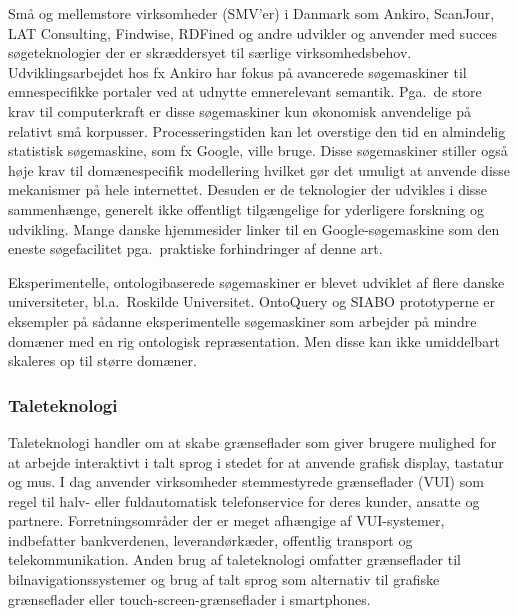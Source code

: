 \begin{multicols}{2}
\mbox{Sm\aa} og mellemstore virksomheder (SMV'er) i Danmark som Ankiro, ScanJour, LAT Consulting, Findwise, RDFined og andre udvikler og anvender med succes s\o geteknologier der er skr\ae ddersyet til s\ae rlige virksomhedsbehov. Udviklingsarbejdet hos fx Ankiro har fokus \mbox{p\aa} avancerede s\o gemaskiner til emnespecifikke portaler ved at udnytte emnerelevant semantik. Pga.\ de store krav til computerkraft er disse s\o gemaskiner kun \o konomisk anvendelige \mbox{p\aa} relativt \mbox{sm\aa} korpusser. Processeringstiden kan let overstige den tid en almindelig statistisk s\o gemaskine, som fx Google, ville bruge. Disse s\o gemaskiner stiller \mbox{ogs\aa} h\o je krav til dom\ae nespecifik modellering hvilket g\o r det umuligt at anvende disse mekanismer \mbox{p\aa} hele internettet. Desuden er de teknologier der udvikles i disse sammenh\ae nge, generelt ikke offentligt tilg\ae ngelige for yderligere forskning og udvikling. Mange danske hjemmesider linker til en Google-s\o gemaskine som den eneste s\o gefacilitet pga.\ praktiske forhindringer af denne art.

Eksperimentelle, ontologibaserede s\o ge\-maskiner er blevet udviklet af flere danske universiteter, bl.a.\ Roskilde Universitet. OntoQuery og SIABO prototyperne er eksempler \mbox{p\aa} s\aa danne eksperimentelle s\o gemaskiner som arbejder \mbox{p\aa} mindre dom\ae ner med en rig ontologisk repr\ae sentation.   Men disse kan ikke umiddelbart skaleres op til st\o rre dom\ae ner.
  
\subsubsection{Taleteknologi}

 Taleteknologi handler om at skabe gr\ae nseflader som giver brugere mulighed for at arbejde interaktivt i talt sprog i stedet for at anvende grafisk display, tastatur og mus. I dag anvender virksomheder stemmestyrede gr\ae nseflader (VUI) som regel til halv- eller fuldautomatisk telefonservice for deres kunder, ansatte og partnere. Forretningsomr\aa der der er meget afh\ae ngige af VUI-systemer, indbefatter bankverdenen, leverand\o rk\ae der, offentlig transport og telekommunikation. Anden brug af taleteknologi omfatter gr\ae nseflader til bilnavigationssystemer og brug af talt sprog som alternativ til grafiske gr\ae nseflader eller touch-screen-gr\ae nseflader i smartphones. 



\end{multicols}
